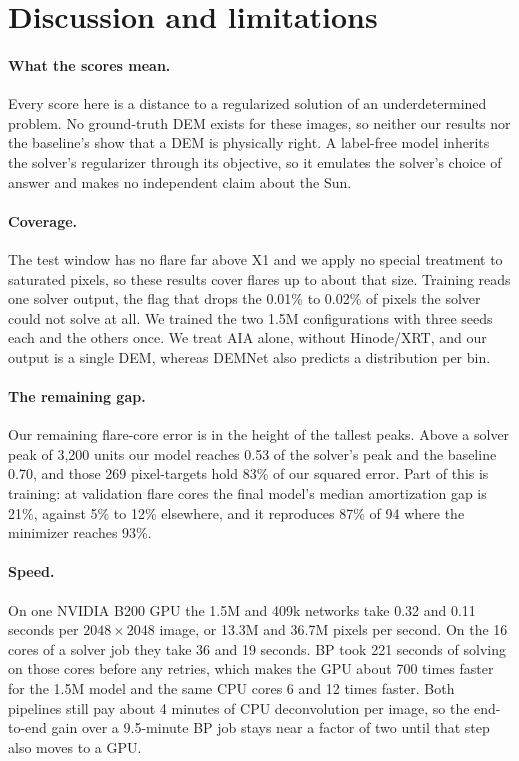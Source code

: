 \section{Discussion and limitations}
\label{sec:discussion}

\paragraph{What the scores mean.}
Every score here is a distance to a regularized solution of an underdetermined problem. No ground-truth DEM exists for these images, so neither our results nor the baseline's show that a DEM is physically right. A label-free model inherits the solver's regularizer through its objective, so it emulates the solver's choice of answer and makes no independent claim about the Sun.

\paragraph{Coverage.}
The test window has no flare far above X1 and we apply no special treatment to saturated pixels, so these results cover flares up to about that size. Training reads one solver output, the flag that drops the 0.01\% to 0.02\% of pixels the solver could not solve at all. We trained the two 1.5M configurations with three seeds each and the others once. We treat AIA alone, without Hinode/XRT, and our output is a single DEM, whereas DEMNet also predicts a distribution per bin.

\paragraph{The remaining gap.}
Our remaining flare-core error is in the height of the tallest peaks. Above a solver peak of 3,200 units our model reaches 0.53 of the solver's peak and the baseline 0.70, and those 269 pixel-targets hold 83\% of our squared error. Part of this is training: at validation flare cores the final model's median amortization gap is 21\%, against 5\% to 12\% elsewhere, and it reproduces 87\% of 94\Ang{} where the minimizer reaches 93\%.

\paragraph{Speed.}
On one NVIDIA B200 GPU the 1.5M and 409k networks take 0.32 and 0.11 seconds per $2048\times2048$ image, or 13.3M and 36.7M pixels per second. On the 16 cores of a solver job they take 36 and 19 seconds. BP took 221 seconds of solving on those cores before any retries, which makes the GPU about 700 times faster for the 1.5M model and the same CPU cores 6 and 12 times faster. Both pipelines still pay about 4 minutes of CPU deconvolution per image, so the end-to-end gain over a 9.5-minute BP job stays near a factor of two until that step also moves to a GPU.

